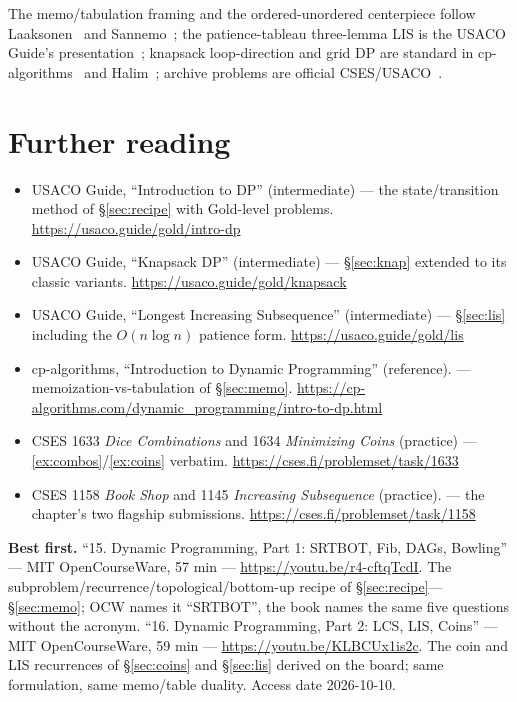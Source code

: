 \chapternotes
The memo/tabulation framing and the ordered-unordered centerpiece
follow Laaksonen~\cite{laaksonen2024} and Sannemo~\cite{sannemo2025};
the patience-tableau three-lemma LIS is the USACO Guide's
presentation~\cite{usacoguide}; knapsack loop-direction and grid DP
are standard in cp-algorithms~\cite{cpalgorithms} and
Halim~\cite{halimcp4}; archive problems are official
CSES/USACO~\cite{cses}.

\section*{Further reading}
\begin{itemize}
\item USACO Guide, ``Introduction to DP'' (intermediate) --- the state/transition
method of \S\ref{sec:recipe} with Gold-level problems. \newline\url{https://usaco.guide/gold/intro-dp}
\item USACO Guide, ``Knapsack DP'' (intermediate) --- \S\ref{sec:knap} extended
to its classic variants. \newline\url{https://usaco.guide/gold/knapsack}
\item USACO Guide, ``Longest Increasing Subsequence'' (intermediate) --- \S\ref{sec:lis} including the
$O(n\log n)$ patience form. \newline\url{https://usaco.guide/gold/lis}
\item cp-algorithms, ``Introduction to Dynamic Programming''
(reference).
--- memoization-vs-tabulation of \S\ref{sec:memo}. \newline\url{https://cp-algorithms.com/dynamic_programming/intro-to-dp.html}
\item CSES 1633 \emph{Dice Combinations} and 1634 \emph{Minimizing
Coins} (practice) ---
\ref{ex:combos}/\ref{ex:coins} verbatim. \newline\url{https://cses.fi/problemset/task/1633}
\item CSES 1158 \emph{Book Shop} and 1145 \emph{Increasing
Subsequence} (practice).
--- the chapter's two flagship submissions. \newline\url{https://cses.fi/problemset/task/1158}\end{itemize}

\begin{rulebox}
\smallskip\noindent\textbf{Best first.}
``15. Dynamic Programming, Part 1: SRTBOT, Fib, DAGs, Bowling'' ---
MIT OpenCourseWare, 57 min ---
\url{https://youtu.be/r4-cftqTcdI}. The
subproblem/recurrence/topological/bottom-up recipe of
\S\ref{sec:recipe}---\S\ref{sec:memo}; OCW names it ``SRTBOT'', the
book names the same five questions without the acronym.
\smallskip\noindent
``16. Dynamic Programming, Part 2: LCS, LIS, Coins'' --- MIT
OpenCourseWare, 59 min ---
\url{https://youtu.be/KLBCUx1is2c}. The coin and LIS
recurrences of \S\ref{sec:coins} and \S\ref{sec:lis} derived on the
board; same formulation, same memo/table duality. Access date
2026-10-10.
\end{rulebox}
